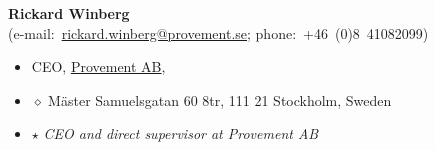 \documentclass[10pt]{article}
\newenvironment{innerlist}[1][\enskip\textbullet]%
                                                                            {\begin{itemize}[#1,leftmargin=*,parsep=0pt,itemsep=0pt,topsep=0pt,partopsep=0pt]}
                                                                            {\end{itemize}}
\begin{document}
                                                                                           \textbf{Rickard Winberg}\\
                                                                                           (e-mail:~\href{mailto:rickard.winberg@provement.se}{rickard.winberg@provement.se}; phone:~+46~(0)8~41082099)
                                                                                           \begin{innerlist}
                                                                                           \item CEO,
                                                                                             \href{http://www.provement.se/}{Provement AB},

                                                                                           \item[$\diamond$] M\"{a}ster Samuelsgatan 60 8tr, 111 21 Stockholm, Sweden

                                                                                           \item[$\star$] \emph{CEO and direct supervisor at Provement AB}
                                                                                           \end{innerlist}


\end{document}
